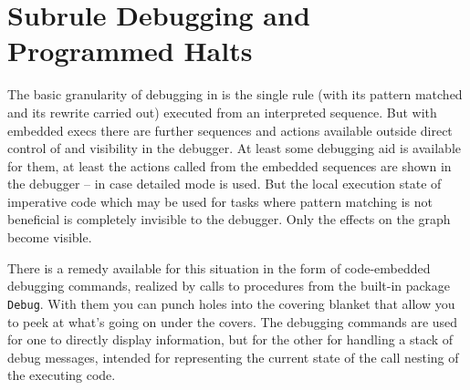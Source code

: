 \pagebreak

\section{Subrule Debugging and Programmed Halts}\label{secdebuggersubrule}

The basic granularity of debugging in \GrG{} is the single rule (with its pattern matched and its rewrite carried out) executed from an interpreted sequence.
But with embedded execs there are further sequences and actions available outside direct control of and visibility in the debugger.
At least some debugging aid is available for them, at least the actions called from the embedded sequences are shown in the debugger -- in case detailed mode is used.
But the local execution state of imperative code which may be used for tasks where pattern matching is not beneficial is completely invisible to the debugger.
Only the effects on the graph become visible.

There is a remedy available for this situation in the form of code-embedded debugging commands, realized by calls to procedures from the built-in package \texttt{Debug}.
With them you can punch holes into the covering blanket that allow you to peek at what's going on under the covers.
The debugging commands are used for one to directly display information, but for the other for handling a stack of debug messages, intended for representing the current state of the call nesting of the executing code.

